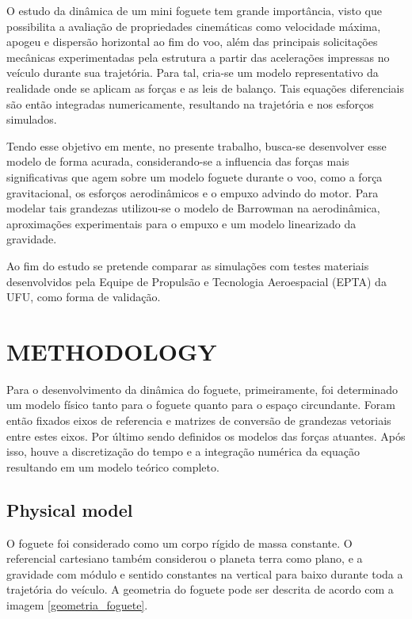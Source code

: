 \documentclass[10pt,fleqn,a4paper,twoside]{article}
\begin{document}
O estudo da dinâmica de um mini foguete tem grande importância, visto que possibilita a avaliação de propriedades cinemáticas como velocidade máxima, apogeu e dispersão horizontal ao fim do voo, além das principais solicitações mecânicas experimentadas pela estrutura a partir das acelerações impressas no veículo durante sua trajetória. Para tal, cria-se um modelo representativo da realidade onde se aplicam as forças e as leis de balanço. Tais equações diferenciais são então integradas numericamente, resultando na trajetória e nos esforços simulados. 

Tendo esse objetivo em mente, no presente trabalho, busca-se desenvolver esse modelo de forma acurada, considerando-se a influencia das forças mais significativas que agem sobre um modelo foguete durante o voo, como a força gravitacional, os esforços aerodinâmicos e o empuxo advindo do motor. Para modelar tais grandezas utilizou-se o modelo de Barrowman na aerodinâmica, aproximações experimentais para o empuxo e um modelo linearizado da gravidade.

Ao fim do estudo se pretende comparar as simulações com testes materiais desenvolvidos pela Equipe de Propulsão e Tecnologia Aeroespacial (EPTA) da UFU, como forma de validação.  

\section{METHODOLOGY}
Para o desenvolvimento da dinâmica do foguete, primeiramente, foi determinado um modelo físico tanto para o foguete quanto para o espaço circundante. Foram então fixados eixos de referencia e matrizes de conversão de grandezas vetoriais entre estes eixos. Por último sendo definidos os modelos das forças atuantes. Após isso, houve a discretização do tempo e a integração numérica da equação resultando em um modelo teórico completo.


\subsection{Physical model}
O foguete foi considerado como um corpo rígido de massa constante. O referencial cartesiano também considerou o planeta terra como plano, e a gravidade com módulo e sentido constantes na vertical para baixo durante toda a trajetória do veículo. A geometria do foguete pode ser descrita de acordo com a imagem \ref{geometria_foguete}.
\end{document}
